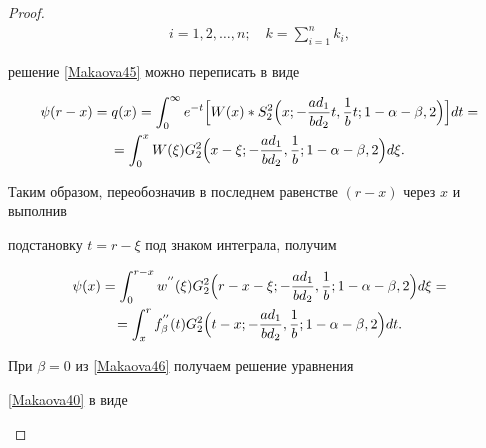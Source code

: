 \begin{proof}
\begin{gather}
i= 1,2, \dots, n;\quad   k=\sum _{i=1}^n k_i,

\end{gather}

решение \eqref{Makaova45}  можно переписать в виде



\begin{multline}

\psi(r-x)=q(x)= 

\int _{0}^{\infty}e^{-t} \Bigl[W(x)* S_2^2 \Bigl( x; -\frac{ad_1}{bd_2}t, \frac{1}{b}t;1-\alpha-\beta,2 \Bigr)\Bigr]

dt=

\\

= \int _{0}^{x} W(\xi)  G_2^2 \Bigl( x-\xi; -\frac{ad_1}{bd_2}, \frac{1}{b};1-\alpha-\beta,2 \Bigr) d\xi.

\end{multline}

Таким образом, переобозначив в последнем равенстве $(r-x)$ через $x$ и выполнив

подстановку $t=r-\xi$ под знаком интеграла, получим

\begin{multline}

\psi(x)= \int _{0}^{r-x} w^{''}(\xi)  G_2^2

\Bigl( r-x-\xi; -\frac{ad_1}{bd_2}, \frac{1}{b};1-\alpha-\beta,2 \Bigr) d\xi=

\\

\label{Makaova46}

=\int _{x}^{r} f_\beta^{''}(t) G_2^2

\Bigl( t-x; -\frac{ad_1}{bd_2}, \frac{1}{b};1-\alpha-\beta,2 \Bigr) dt.

\end{multline}

















При $\beta=0$ из \eqref{Makaova46} получаем решение  уравнения 

 \eqref{Makaova40} в виде

\begin{equation}

\label{Makaova47} 


\end{equation}
\end{proof}
